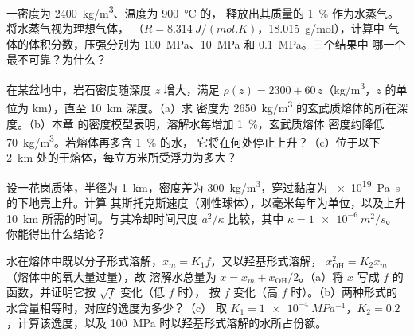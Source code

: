 \begin{exercise}[$\star\star$]\label{exo:b2:magma-emplacement:7}
一密度为 \qty{2400}{kg/m^3}、温度为 \qty{900}{\celsius} 的，
释放出其质量的 \qty{1}{\percent} 作为水蒸气。将水蒸气视为理想气体，
（$R = \qty{8.314}{J/(mol.K)}$，\qty{18.015}{g/mol}），计算中
气体的体积分数，压强分别为 \qty{100}{MPa}、\qty{10}{MPa} 和 \qty{0.1}{MPa}。三个结果中
哪一个最不可靠？为什么？
\end{exercise}

\begin{exercise}[$\star\star$]\label{exo:b2:magma-emplacement:8}
在某盆地中，岩石密度随深度 $z$ 增大，满足 $\rho(z) =
2300 + 60\,z$（\unit{kg/m^3}，$z$ 的单位为 \unit{km}），直至 \qty{10}{km} 深度。（a）求
密度为 \qty{2650}{kg/m^3} 的玄武质熔体的所在深度。（b）本章
的密度模型表明，溶解水每增加 \qty{1}{\percent}，玄武质熔体
密度约降低 \qty{70}{kg/m^3}。若熔体再多含 \qty{1}{\percent} 的水，
它将在何处停止上升？（c）位于以下
\qty{2}{km} 处的干熔体，每立方米所受浮力为多大？
\end{exercise}

\begin{exercise}[$\star\star$]\label{exo:b2:magma-emplacement:9}
设一花岗质体，半径为 \qty{1}{km}，密度差为
\qty{300}{kg/m^3}，穿过黏度为 \qty{e19}{Pa.s} 的下地壳上升。计算
其斯托克斯速度（刚性球体），以毫米每年为单位，以及上升
\qty{10}{km} 所需的时间。与其冷却时间尺度 $a^2/\kappa$ 比较，其中 $\kappa
= \qty{1e-6}{m^2/s}$。你能得出什么结论？
\end{exercise}

\begin{exercise}[$\star\star\star$]\label{exo:b2:magma-emplacement:10}
水在熔体中既以分子形式溶解，$x_m = K_1 f$，又以羟基形式溶解，
$x_{\mathrm{OH}}^2 = K_2 x_m$（熔体中的氧大量过量），故
溶解水总量为 $x = x_m + x_{\mathrm{OH}}/2$。（a）将 $x$ 写成
$f$ 的函数，并证明它按 $\sqrt f$ 变化（低 $f$ 时），
按 $f$ 变化（高 $f$ 时）。（b）两种形式的水含量相等时，对应的逸度为多少？（c）
取 $K_1 = \qty{1e-4}{MPa^{-1}}$，$K_2 = 0.2$，计算该逸度，以及
\qty{100}{MPa} 时以羟基形式溶解的水所占份额。
\end{exercise}

